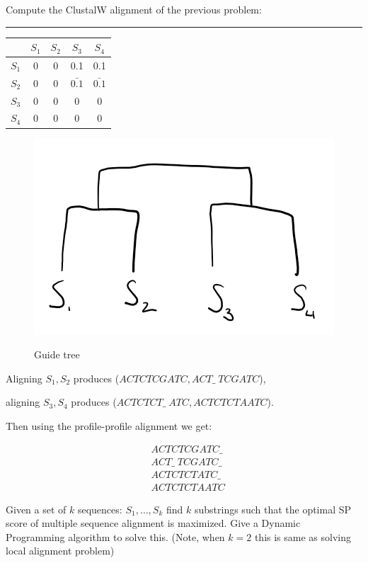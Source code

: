 \documentclass[11pt]{article}
\begin{document}
Compute the ClustalW alignment of the previous problem:

\hrule


\begin{table}[H]
    \centering
    \begin{tabular}{c | c | c | c | c }
              & $S_1$ & $S_2$ & $S_3$ & $S_4$ \\ \hline
        $S_1$ &  0    &   0   &   0.1   & 0.1     \\ \hline
        $S_2$ &  0    &   0   &   $\bar{0.1}$   & $\bar{0.1}$     \\ \hline
        $S_3$ &  0    &   0   &   0   & 0     \\ \hline
        $S_4$ &  0    &   0   &   0   & 0     \\ \hline
        
    \end{tabular}
\end{table}

\begin{figure}[h] 
    \centering
    \includegraphics[width=0.55 \linewidth]{tree.png}
    \label{fig:}
    \caption{Guide tree}
\end{figure}

Aligning $S_1, S_2$ produces ($ACTCTCGATC, ACT\_ \; TCGATC$),

aligning $S_3, S_4$ produces ($ACTCTCT\_ \; ATC, ACTCTCTAATC$).

Then using the profile-profile alignment we get:

\begin{align*}
    &ACTCTCGATC\_  \\
    &ACT\_ \; TCGATC\_ \\
    &ACTCTCTATC \_ \\
    &ACTCTCTAATC
\end{align*}


Given a set of $k$ sequences: $S_1, \dots , S_k$ find $k$ substrings such that the optimal SP score of multiple sequence alignment is maximized.
Give a Dynamic Programming algorithm to solve this. (Note, when $k=2$ this is same as solving local alignment problem)
\end{document}

